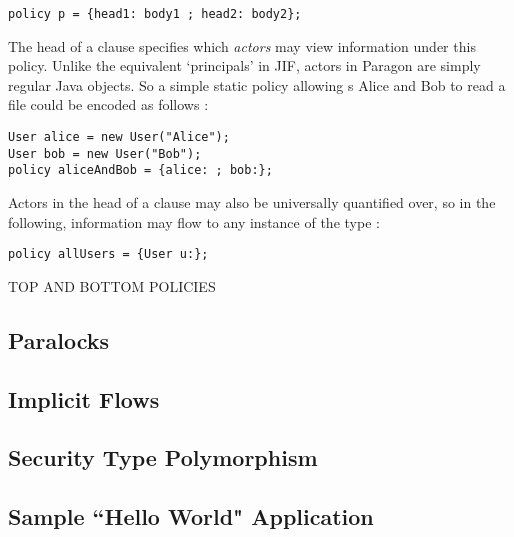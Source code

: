 \begin{verbatim}
policy p = {head1: body1 ; head2: body2};
\end{verbatim}

The head of a clause specifies which \textit{actors} may view information under this policy. Unlike the equivalent `principals' in JIF, actors in Paragon are simply regular Java objects. So a simple static policy allowing s Alice and Bob to read a file could be encoded as follows \cite{broberg2013paragon}:

\begin{verbatim}
User alice = new User("Alice");
User bob = new User("Bob");
policy aliceAndBob = {alice: ; bob:};
\end{verbatim}

Actors in the head of a clause may also be universally quantified over, so in the following, information may flow to any instance of the type :

\begin{verbatim}
policy allUsers = {User u:};
\end{verbatim}

TOP AND BOTTOM POLICIES

\subsection{Paralocks}

\subsection{Implicit Flows}

\subsection{Security Type Polymorphism} \label{para_generics}

\subsection{Sample ``Hello World" Application}